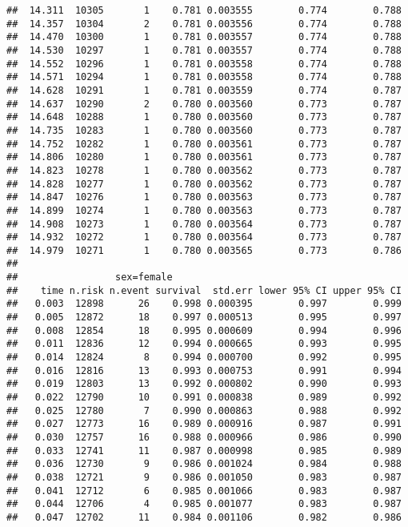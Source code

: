 \documentclass[
]{book}
\begin{document}
\begin{verbatim}
##  14.311  10305       1    0.781 0.003555        0.774        0.788
##  14.357  10304       2    0.781 0.003556        0.774        0.788
##  14.470  10300       1    0.781 0.003557        0.774        0.788
##  14.530  10297       1    0.781 0.003557        0.774        0.788
##  14.552  10296       1    0.781 0.003558        0.774        0.788
##  14.571  10294       1    0.781 0.003558        0.774        0.788
##  14.628  10291       1    0.781 0.003559        0.774        0.787
##  14.637  10290       2    0.780 0.003560        0.773        0.787
##  14.648  10288       1    0.780 0.003560        0.773        0.787
##  14.735  10283       1    0.780 0.003560        0.773        0.787
##  14.752  10282       1    0.780 0.003561        0.773        0.787
##  14.806  10280       1    0.780 0.003561        0.773        0.787
##  14.823  10278       1    0.780 0.003562        0.773        0.787
##  14.828  10277       1    0.780 0.003562        0.773        0.787
##  14.847  10276       1    0.780 0.003563        0.773        0.787
##  14.899  10274       1    0.780 0.003563        0.773        0.787
##  14.908  10273       1    0.780 0.003564        0.773        0.787
##  14.932  10272       1    0.780 0.003564        0.773        0.787
##  14.979  10271       1    0.780 0.003565        0.773        0.786
## 
##                 sex=female 
##    time n.risk n.event survival  std.err lower 95% CI upper 95% CI
##   0.003  12898      26    0.998 0.000395        0.997        0.999
##   0.005  12872      18    0.997 0.000513        0.995        0.997
##   0.008  12854      18    0.995 0.000609        0.994        0.996
##   0.011  12836      12    0.994 0.000665        0.993        0.995
##   0.014  12824       8    0.994 0.000700        0.992        0.995
##   0.016  12816      13    0.993 0.000753        0.991        0.994
##   0.019  12803      13    0.992 0.000802        0.990        0.993
##   0.022  12790      10    0.991 0.000838        0.989        0.992
##   0.025  12780       7    0.990 0.000863        0.988        0.992
##   0.027  12773      16    0.989 0.000916        0.987        0.991
##   0.030  12757      16    0.988 0.000966        0.986        0.990
##   0.033  12741      11    0.987 0.000998        0.985        0.989
##   0.036  12730       9    0.986 0.001024        0.984        0.988
##   0.038  12721       9    0.986 0.001050        0.983        0.987
##   0.041  12712       6    0.985 0.001066        0.983        0.987
##   0.044  12706       4    0.985 0.001077        0.983        0.987
##   0.047  12702      11    0.984 0.001106        0.982        0.986

\end{verbatim}
\end{document}
